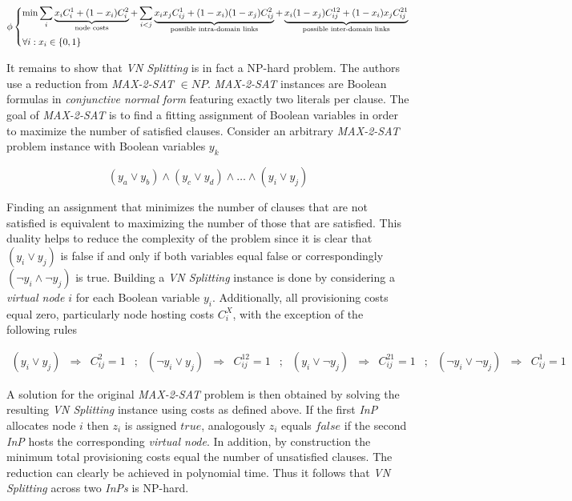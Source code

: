 \documentclass[prodmode,acmtomccap]{acmlarge}
\begin{document}
\normalsize

\[
 \phi
   \begin{dcases}
		\min \sum\limits_{i} \underbrace{x_i C_i^1 + (1-x_i) C_i^2 }_{\text{node costs}}
			+ \sum\limits_{i < j} \underbrace{x_i x_j C_{ij}^{1} + (1 - x_i)(1 - x_j) C_{ij}^{2}}_{\text{possible intra-domain links}}
			+ \underbrace{x_i (1 - x_j) C_{ij}^{12} + (1 - x_i)x_j C_{ij}^{21}}_{\text{possible inter-domain links}} \\
		\forall i : x_i \in \{ 0,1\}
   \end{dcases}
\]

\small

It remains to show that \emph{VN Splitting} is in fact a NP-hard problem. The authors use a reduction from \emph{MAX-2-SAT} $\in NP$. \emph{MAX-2-SAT} instances
are Boolean formulas in \emph{conjunctive normal form}
featuring exactly two literals per clause. The goal of \emph{MAX-2-SAT} is to find a fitting assignment of Boolean variables in order to maximize the number of satisfied clauses. Consider an arbitrary 
\emph{MAX-2-SAT} problem instance with Boolean variables $y_k$

\normalsize

$$
(y_a \vee y_b) \wedge (y_c \vee y_d) \wedge \dots \wedge (y_i \vee y_j)
$$

\small

Finding an assignment that minimizes the number of clauses that are not satisfied is equivalent to maximizing the number of those that are satisfied. This duality helps to reduce the complexity of the problem
since it is clear that $(y_i \vee y_j)$ is false if and only if both variables equal false or correspondingly $(\lnot y_i \wedge \lnot y_j)$ is true.
Building a \emph{VN Splitting} instance is done by considering a \emph{virtual node} $i$ for each Boolean variable $y_i$. Additionally, all provisioning costs equal zero, particularly node hosting costs $C_i^{X}$,
with the exception of the following rules

\normalsize

$$
\begin{array}{cccccccccccccccc}
	(y_i \vee y_j) & \Rightarrow & C_{ij}^2 = 1 &;& (\lnot y_i \vee y_j) & \Rightarrow &C_{ij}^{12} = 1 &;& (y_i \vee \lnot y_j) & \Rightarrow & C_{ij}^{21} = 1 &;& (\lnot y_i \vee \lnot y_j) & \Rightarrow & C_{ij}^1 = 1
	
\end{array}
$$

\small

A solution for the original \emph{MAX-2-SAT} problem is then obtained by solving the resulting \emph{VN Splitting} instance using costs as defined above. If the first \emph{InP} allocates node $i$
then $z_i$ is assigned $true$, analogously $z_i$ equals $false$ if the second \emph{InP} hosts the corresponding \emph{virtual node}. In addition, by construction the minimum 
total provisioning costs equal the number of unsatisfied clauses.
The reduction can clearly be achieved in polynomial time. Thus it follows that \emph{VN Splitting} across two \emph{InPs} is NP-hard.
\end{document}
